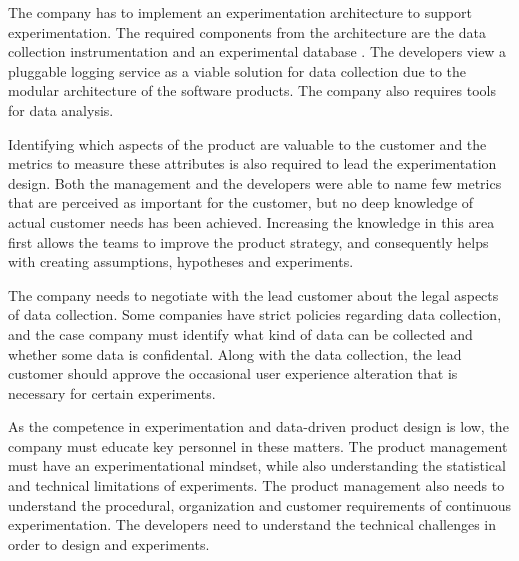 \documentclass[english]{tktltiki2}
\theoremstyle{definition}
\theoremstyle{remark}
\begin{document}
The company has to implement an experimentation architecture to support experimentation. The required components from the architecture are the data collection instrumentation and an experimental database \cite{kohavi2007practical, fagerholm2014building}. The developers view a pluggable logging service as a viable solution for data collection due to the modular architecture of the software products. The company also requires tools for data analysis.

Identifying which aspects of the product are valuable to the customer and the metrics to measure these attributes is also required to lead the experimentation design. Both the management and the developers were able to name few metrics that are perceived as important for the customer, but no deep knowledge of actual customer needs has been achieved. Increasing the knowledge in this area first allows the teams to improve the product strategy, and consequently helps with creating assumptions, hypotheses and experiments. 

The company needs to negotiate with the lead customer about the legal aspects of data collection. Some companies have strict policies regarding data collection, and the case company must identify what kind of data can be collected and whether some data is confidental. Along with the data collection, the lead customer should approve the occasional user experience alteration that is necessary for certain experiments. 

As the competence in experimentation and data-driven product design is low, the company must educate key personnel in these matters. The product management must have an experimentational mindset, while also understanding the statistical and technical limitations of experiments. The product management also needs to understand the procedural, organization and customer requirements of continuous experimentation. The developers need to understand the technical challenges in order to design and experiments.
\end{document}
